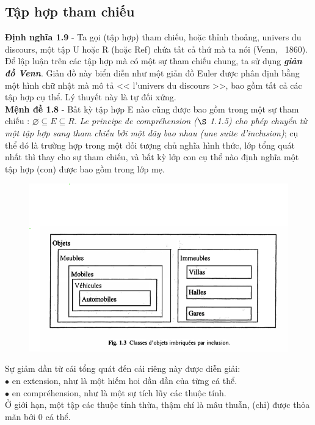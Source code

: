 \documentclass[11pt,a4paper]{report}
\begin{document}
\subsection{Tập hợp tham chiếu}
\textbf{Định nghĩa 1.9} - Ta gọi (tập hợp) tham chiếu, hoặc thỉnh thoảng, univers du discours, một tập U hoặc R (hoặc Ref) chứa tất cả thứ mà ta nói (Venn, ~1860).\\
Để lập luận trên các tập hợp mà có một sự tham chiếu chung, ta sử dụng \textbf{\textit{giản đồ Venn}}. Giản đồ này biển diễn như một giản đồ Euler được phân định bằng một hình chữ nhật mà mô tả << l'univers du discours >>, bao gồm tất cả các tập hợp cụ thể. Lý thuyết này là tự đối xứng.\\
\textbf{Mệnh đề 1.8} - Bất kỳ tập hợp E nào cũng được bao gồm trong một sự tham chiếu : $\varnothing \subseteq E \subseteq R$.
\textit{Le principe de compréhension ($\S$ 1.1.5) cho phép chuyển từ một tập hợp sang tham chiếu bởi một dãy bao nhau (une suite d'inclusion)}; cụ thể đó là trường hợp trong một đối tượng chủ nghĩa hình thức, lớp tổng quát nhất thì thay cho sự tham chiếu, và bất kỳ lớp con cụ thể nào định nghĩa một tập hợp (con) được bao gồm trong lớp mẹ.
\begin{center}
	\begin{figure}[htp]
		\begin{center}
			\includegraphics{1.3}
		\end{center}
	\end{figure}
\end{center}
Sự giảm dần từ cái tổng quát đến cái riêng này được diễn giải:\\
$\bullet$ en extension, như là một hiếm hoi dần dần của từng cá thể.\\
$\bullet$ en compréhension, như là một sự tích lũy các thuộc tính.\\
Ở giới hạn, một tập các thuộc tính thừa, thậm chí là mâu thuẫn, (chỉ) được thỏa mãn bởi 0 cá thể.
\end{document}
